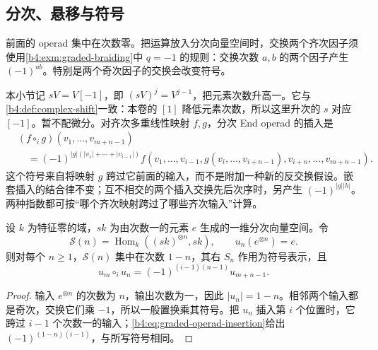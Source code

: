 \subsection{分次、悬移与符号}
\label{b4:subsec:G03:02}

前面的 operad 集中在次数零。把运算放入分次向量空间时，交换两个齐次因子须使用\cref{b4:exm:graded-braiding}中 \(q=-1\) 的规则：交换次数 \(a,b\) 的两个因子产生 \((-1)^{ab}\)。特别是两个奇次因子的交换会改变符号。

\ProseParagraphBreak
本小节记 \(sV=V[-1]\)，即 \((sV)^j=V^{j-1}\)，把元素次数升高一。它与\cref{b4:def:complex-shift}一致：本卷的 \([1]\) 降低元素次数，所以这里升次的 \(s\) 对应 \([-1]\)。暂不配微分。对齐次多重线性映射 \(f,g\)，分次 End operad 的插入是
\begin{equation}\label{b4:eq:graded-operad-insertion}
	\begin{aligned}
		&(f\circ_i g)(v_1,\ldots,v_{m+n-1})\\
		&\quad=(-1)^{|g|(|v_1|+\cdots+|v_{i-1}|)}
		f(v_1,\ldots,v_{i-1},g(v_i,\ldots,v_{i+n-1}),v_{i+n},\ldots,v_{m+n-1}).
	\end{aligned}
\end{equation}
这个符号来自将映射 \(g\) 跨过它前面的输入，而不是附加一种新的反交换假设。嵌套插入的结合律不变；互不相交的两个插入交换先后次序时，另产生 \((-1)^{|g||h|}\)。两种指数都可按“哪个齐次映射跨过了哪些齐次输入”计算。

\begin{proposition}\label{b4:prop:operadic-suspension-sign}
	设 \(k\) 为特征零的域，\(sk\) 为由次数一的元素 \(e\) 生成的一维分次向量空间。令
	\[
		\mathcal S(n)=\operatorname{Hom}_k((sk)^{\otimes n},sk),\qquad
		u_n(e^{\otimes n})=e.
	\]
	则对每个 \(n\ge1\)，\(\mathcal S(n)\) 集中在次数 \(1-n\)，其右 \(S_n\) 作用为符号表示，且
	\begin{equation}\label{b4:eq:suspension-operad-composition}
		u_m\circ_i u_n=(-1)^{(i-1)(n-1)}u_{m+n-1}.
	\end{equation}
\end{proposition}
\begin{proof}
	输入 \(e^{\otimes n}\) 的次数为 \(n\)，输出次数为一，因此 \(|u_n|=1-n\)。相邻两个输入都是奇次，交换它们乘 \(-1\)，所以一般置换乘其符号。把 \(u_n\) 插入第 \(i\) 个位置时，它跨过 \(i-1\) 个次数一的输入；\eqref{b4:eq:graded-operad-insertion}给出 \((-1)^{(1-n)(i-1)}\)，与所写符号相同。
\end{proof}

